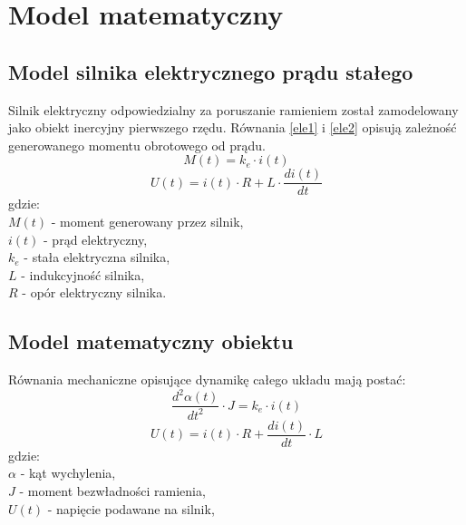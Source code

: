 \chapter{Model matematyczny}
\label{cha:model_matematyczny}

\section{Model silnika elektrycznego prądu stałego}
Silnik elektryczny odpowiedzialny za poruszanie ramieniem został zamodelowany jako obiekt inercyjny pierwszego rzędu. Równania \ref{ele1} i \ref{ele2} opisują zależność generowanego momentu obrotowego od prądu.
\begin{equation}\label{ele1}
M(t) = k_e \cdot i(t)
\end{equation}
\begin{equation}\label{ele2}
U(t) = i(t) \cdot R + L \cdot \frac{di(t)}{dt}
\end{equation}
\noindent gdzie:\\
$M(t)$ - moment generowany przez silnik,\\
$i(t)$ - prąd elektryczny,\\
$k_e$ - stała elektryczna silnika,\\
$L$ - indukcyjność silnika,\\
\(R\) - opór elektryczny silnika.

\section{Model matematyczny obiektu}
Równania mechaniczne opisujące dynamikę całego układu mają postać:\\
\begin{equation}\label{r1}
\frac{d^2 \alpha(t)}{dt^2} \cdot J = k_e \cdot i(t) 
\end{equation}
\begin{equation}\label{r2}
U(t) = i(t) \cdot R + \frac{d i(t)}{dt} \cdot L
\end{equation}
gdzie:\\
$\alpha$ - kąt wychylenia,\\
$J$ - moment bezwładności ramienia,\\
$U(t)$ - napięcie podawane na silnik,\\

